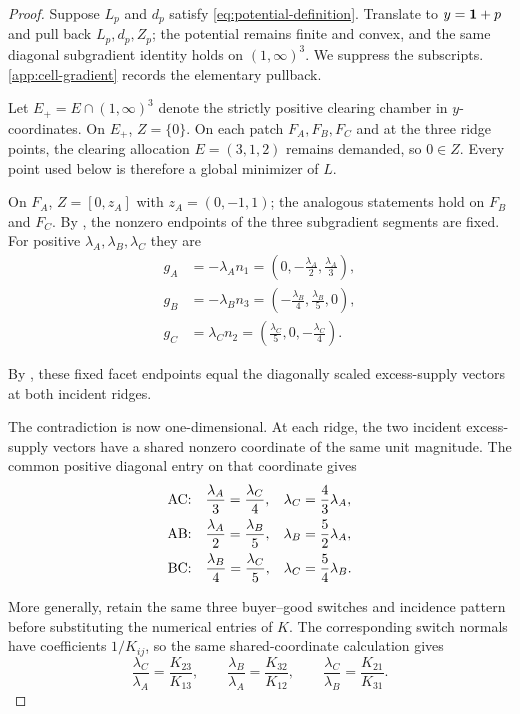 \begin{proof}
Suppose $L_p$ and $d_p$ satisfy \eqref{eq:potential-definition}. Translate to $y=\mathbf{1}+p$ and pull back $L_p,d_p,Z_p$; the potential remains finite and convex, and the same diagonal subgradient identity holds on $(1,\infty)^3$. We suppress the subscripts. \ref{app:cell-gradient} records the elementary pullback.

Let $E_+=E\cap(1,\infty)^3$ denote the strictly positive clearing chamber in $y$-coordinates. On $E_+$, $Z=\{0\}$. On each patch $F_A,F_B,F_C$ and at the three ridge points, the clearing allocation $E=(3,1,2)$ remains demanded, so $0\in Z$. Every point used below is therefore a global minimizer of $L$.

On $F_A$, $Z=[0,z_A]$ with $z_A=(0,-1,1)$; the analogous statements hold on $F_B$ and $F_C$. By , the nonzero endpoints of the three subgradient segments are fixed. For positive $\lambda_A,\lambda_B,\lambda_C$ they are
\begin{equation}\label{eq:facet-endpoints}
\begin{aligned}
g_A&=-\lambda_A n_1
=\left(0,-\frac{\lambda_A}{2},\frac{\lambda_A}{3}\right),\\
g_B&=-\lambda_B n_3
=\left(-\frac{\lambda_B}{4},\frac{\lambda_B}{5},0\right),\\
g_C&=\lambda_C n_2
=\left(\frac{\lambda_C}{5},0,-\frac{\lambda_C}{4}\right).
\end{aligned}
\end{equation}

By , these fixed facet endpoints equal the diagonally scaled excess-supply vectors at both incident ridges.

The contradiction is now one-dimensional. At each ridge, the two incident excess-supply vectors have a shared nonzero coordinate of the same unit magnitude. The common positive diagonal entry on that coordinate gives
\begin{align}
\text{AC:}\quad &\frac{\lambda_A}{3}=\frac{\lambda_C}{4},
&\lambda_C&=\frac43\lambda_A,\notag\\
\text{AB:}\quad &\frac{\lambda_A}{2}=\frac{\lambda_B}{5},
&\lambda_B&=\frac52\lambda_A,\notag\\
\text{BC:}\quad &\frac{\lambda_B}{4}=\frac{\lambda_C}{5},
&\lambda_C&=\frac54\lambda_B.\label{eq:ridge-ratios}
\end{align}

More generally, retain the same three buyer--good switches and incidence pattern before substituting the numerical entries of $K$. The corresponding switch normals have coefficients $1/K_{ij}$, so the same shared-coordinate calculation gives
\begin{equation}\label{eq:symbolic-ridge-ratios}
\frac{\lambda_C}{\lambda_A}=\frac{K_{23}}{K_{13}},
\qquad
\frac{\lambda_B}{\lambda_A}=\frac{K_{32}}{K_{12}},
\qquad
\frac{\lambda_C}{\lambda_B}=\frac{K_{21}}{K_{31}}.
\end{equation}


\end{proof}
